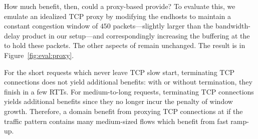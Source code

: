 How much benefit, then, could a proxy-based \name provide?
To evaluate this, we emulate an idealized TCP proxy by modifying the endhosts to maintain a constant congestion window of $450$ packets---slightly larger than the bandwidth-delay product in our setup---and correspondingly increasing the buffering at the \inbox to hold these packets. 
The other aspects of \name remain unchanged.
The result is in Figure~\ref{fig:eval:proxy}. 

For the short requests which never leave TCP slow start, terminating TCP connections does not yield additional benefits: with or without termination, they finish in a few RTTs.
For medium-to-long requests, terminating TCP connections yields additional benefits since they no longer incur the penalty of window growth.
Therefore, a domain benefit from proxying TCP connections at \name if the traffic pattern contains many medium-sized flows which benefit from fast ramp-up.


